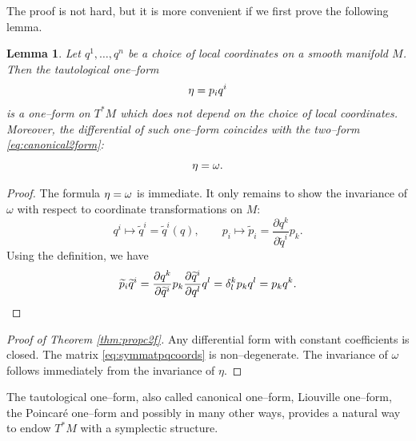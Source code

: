 \documentclass[english,fontsize=11pt,paper=a5,oneside]{scrbook}
\let\d\relax
\DeclareMathOperator{\d}{d}
\newtheorem{lemma}[theorem]{Lemma}
\theoremstyle{definition}
\begin{document}
The proof is not hard, but it is more convenient if we first prove the following lemma.
\begin{lemma}
Let $q^1, \ldots, q^n$ be a choice of local coordinates on a smooth manifold $M$. Then the \emph{tautological one--form}
\begin{equation}
    \eta = p_i \d q^i
\end{equation}
is a one--form on $T^* M$ which does not depend on the choice of local coordinates.
Moreover, the differential of such one--form coincides with the two--form \eqref{eq:canonical2form}:
\begin{equation}
    \d \eta = \omega.
\end{equation}
\end{lemma}

\begin{proof}
    The formula $\d \eta = \omega$ is immediate.
    It only remains to show the invariance of $\omega$ with respect to coordinate transformations on $M$:
    \begin{equation}
        q^i \mapsto \widetilde q^i = \widetilde q^i(q), \qquad
        p_i \mapsto \widetilde p_i = \frac{\partial q^k}{\partial \widetilde q^i} p_k.
    \end{equation}
    Using the definition, we have
    \begin{equation}
        \widetilde p_i \d \widetilde q^i = 
        \frac{\partial q^k}{\partial \widetilde q^i} p_k \frac{\partial \widetilde q^i}{\partial q^l} \d q^l
        = \delta^k_l p_k \d q^l
        = p_k \d q^k.
    \end{equation}
\end{proof}

\begin{proof}[Proof of Theorem \ref{thm:propc2f}]
    Any differential form with constant coefficients is closed.
    The matrix \eqref{eq:symmatpqcoords} is non--degenerate.
    The invariance of $\omega$ follows immediately from the invariance of $\eta$.
\end{proof}

The tautological one--form, also called canonical one--form, Liouville one--form, the Poincar\'e one--form and possibly in many other ways, provides a natural way to endow $T^*M$ with a symplectic structure.
\end{document}

